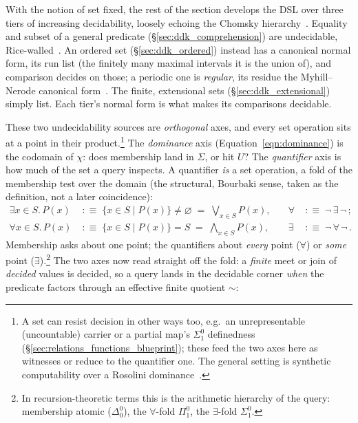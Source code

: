 \documentclass[11pt, a4paper]{article}
\begin{document}
With the notion of set fixed, the rest of the section develops the DSL over three tiers of increasing decidability, loosely echoing the Chomsky hierarchy~\cite{chomsky1956three}.
Equality and subset of a general predicate (§\ref{sec:ddk_comprehension}) are undecidable, Rice-walled~\cite{rice1953classes}.
An ordered set (§\ref{sec:ddk_ordered}) instead has a canonical normal form, its run list (the finitely many maximal intervals it is the union of), and comparison decides on those; a periodic one is \emph{regular}, its residue the Myhill--Nerode canonical form~\cite{nerode1958linear}.
The finite, extensional sets (§\ref{sec:ddk_extensional}) simply list.
Each tier's normal form is what makes its comparisons decidable.

These two undecidability sources are \emph{orthogonal} axes, and every set operation sits at a point in their product.\footnote{A set can resist decision in other ways too, e.g.\ an unrepresentable (uncountable) carrier or a partial map's $\Sigma^0_1$ definedness (§\ref{sec:relations_functions_blueprint}); these feed the two axes here as witnesses or reduce to the quantifier one. The general setting is synthetic computability over a Rosolini dominance~\cite{rosolini1986continuity}.}
The \emph{dominance} axis (Equation~\ref{eqn:dominance}) is the codomain of $\chi$: does membership land in $\Sigma$, or hit $U$?
The \emph{quantifier} axis is how much of the set a query inspects.
A quantifier \emph{is} a set operation, a fold of the membership test over the domain (the structural, Bourbaki sense, taken as the definition, not a later coincidence):
\begin{equation}
\label{eqn:quantifiers}
\begin{aligned}
\exists x \in S.\,P(x) &\;:\equiv\; \{x\in S \mid P(x)\} \neq \varnothing \;=\; \textstyle\bigvee_{x\in S} P(x),
&\quad \forall &\;:\equiv\; \neg\,\exists\,\neg\,;\\
\forall x \in S.\,P(x) &\;:\equiv\; \{x\in S \mid P(x)\} = S \;=\; \textstyle\bigwedge_{x\in S} P(x),
&\quad \exists &\;:\equiv\; \neg\,\forall\,\neg\,.
\end{aligned}
\end{equation}
Membership asks about one point; the quantifiers about \emph{every} point ($\forall$) or \emph{some} point ($\exists$).\footnote{In recursion-theoretic terms this is the arithmetic hierarchy of the query: membership atomic ($\Delta^0_0$), the $\forall$-fold $\Pi^0_1$, the $\exists$-fold $\Sigma^0_1$.}
The two axes now read straight off the fold: a \emph{finite} meet or join of \emph{decided} values is decided, so a query lands in the decidable corner \emph{when} the predicate factors through an effective finite quotient $\sim$:
\end{document}
